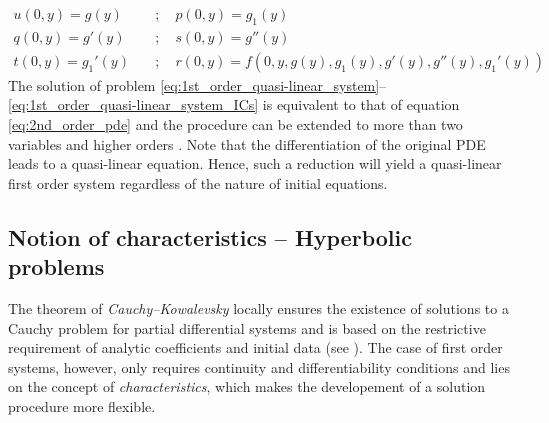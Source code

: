 \begin{equation}
  \label{eq:1st_order_quasi-linear_system_ICs}
  \begin{aligned}
    u(0,y) = g(y) \quad & ; \quad     p(0,y) = g_1(y) \\
    q(0,y) = g'(y) \quad & ; \quad    s(0,y) = g''(y) \\
    t(0,y) = g_1'(y) \quad & ; \quad    r(0,y) = f(0,y,g(y),g_1(y),g'(y),g''(y),g_1'(y))
  \end{aligned}
\end{equation}
The solution of problem \eqref{eq:1st_order_quasi-linear_system}--\eqref{eq:1st_order_quasi-linear_system_ICs}  is equivalent to that of equation \eqref{eq:2nd_order_pde} and the procedure can be extended to more than two variables and higher orders \cite[p.54]{PDEs}. Note that the differentiation of the original PDE leads to a quasi-linear equation. Hence, such a reduction will yield a quasi-linear first order system regardless of the nature of initial equations.

\subsection{Notion of characteristics -- Hyperbolic problems}
The theorem of \textit{Cauchy--Kowalevsky} locally ensures the existence of solutions to a Cauchy problem for partial differential systems and is based on the restrictive requirement of analytic coefficients and initial data (see \cite[p.46]{PDEs}). The case of first order systems, however, only requires continuity and differentiability conditions and lies on the concept of \textit{characteristics}, which makes the developement of a solution procedure more flexible.

